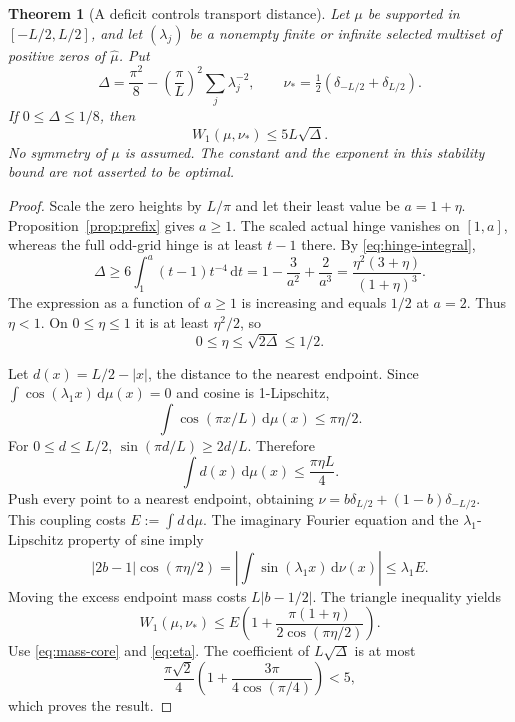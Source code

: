 \documentclass[11pt]{article}
\newtheorem{theorem}{Theorem}[section]
\theoremstyle{remark}\newtheorem{remark}[theorem]{Remark}
\newcommand{\dd}{\,\mathrm d}
\begin{document}
\begin{theorem}[A deficit controls transport distance]\label{thm:stability}
Let $\mu$ be supported in $[-L/2,L/2]$, and let $(\lambda_j)$ be a nonempty finite
or infinite selected multiset of positive zeros of $\widehat\mu$. Put
\[
 \Delta=\frac{\pi^2}{8}-\left(\frac\pi L\right)^2
                         \sum_j\lambda_j^{-2},\qquad
 \nu_* =\tfrac12(\delta_{-L/2}+\delta_{L/2}).
\]
If $0\le\Delta\le1/8$, then
\begin{equation}\label{eq:stability}
 W_1(\mu,\nu_*)\le5L\sqrt\Delta.
\end{equation}
No symmetry of $\mu$ is assumed. The constant and the exponent in this stability
bound are not asserted to be optimal.
\end{theorem}

\begin{proof}
Scale the zero heights by $L/\pi$ and let their least value be $a=1+\eta$.
Proposition~\ref{prop:prefix} gives $a\ge1$. The scaled actual hinge vanishes
on $[1,a]$, whereas the full odd-grid hinge is at least $t-1$ there.
By \eqref{eq:hinge-integral},
\begin{equation}\label{eq:deficit-first}
 \Delta\ge6\int_1^a(t-1)t^{-4}\dd t
 =1-\frac3{a^2}+\frac2{a^3}
 =\frac{\eta^2(3+\eta)}{(1+\eta)^3}.
\end{equation}
The expression as a function of $a\ge1$ is increasing and equals $1/2$ at
$a=2$. Thus $\eta<1$. On $0\le\eta\le1$ it is at least $\eta^2/2$, so
\begin{equation}\label{eq:eta}
 0\le\eta\le\sqrt{2\Delta}\le1/2.
\end{equation}

Let $d(x)=L/2-|x|$, the distance to the nearest endpoint. Since
$\int\cos(\lambda_1x)\dd\mu(x)=0$ and cosine is 1-Lipschitz,
\[
 \int\cos(\pi x/L)\dd\mu(x)\le\pi\eta/2.
\]
For $0\le d\le L/2$, $\sin(\pi d/L)\ge2d/L$. Therefore
\begin{equation}\label{eq:mass-core}
 \int d(x)\dd\mu(x)\le\frac{\pi\eta L}{4}.
\end{equation}
Push every point to a nearest endpoint, obtaining
$\nu=b\delta_{L/2}+(1-b)\delta_{-L/2}$. This coupling costs
$E:=\int d\dd\mu$. The imaginary Fourier equation and the
$\lambda_1$-Lipschitz property of sine imply
\[
 |2b-1|\cos(\pi\eta/2)
 =\left|\int\sin(\lambda_1x)\dd\nu(x)\right|
 \le\lambda_1 E.
\]
Moving the excess endpoint mass costs $L|b-1/2|$. The triangle inequality yields
\[
 W_1(\mu,\nu_*)\le
 E\left(1+\frac{\pi(1+\eta)}{2\cos(\pi\eta/2)}\right).
\]
Use \eqref{eq:mass-core} and \eqref{eq:eta}. The coefficient of
$L\sqrt\Delta$ is at most
\[
 \frac{\pi\sqrt2}{4}
 \left(1+\frac{3\pi}{4\cos(\pi/4)}\right)<5,
\]
which proves the result.
\end{proof}
\end{document}
